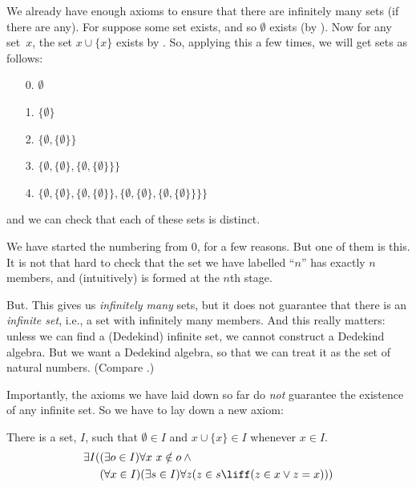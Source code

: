 \documentclass[../../../include/open-logic-section]{subfiles}
\begin{document}

We already have enough axioms to ensure that there are infinitely many
sets (if there are any). For suppose some set exists, and so
$\emptyset$ exists (by ). Now for
any set~$x$, the set $x \cup \{x\}$ exists by
. So, applying this a few
times, we will get sets as follows:
\begin{enumerate}
	\item[0.] $\emptyset$ %
	\item[1.] $ \{\emptyset\}$ %
	\item[2.] $\{\emptyset, \{\emptyset\}\}$ %
	\item[3.] $\{\emptyset, \{\emptyset\}, \{\emptyset, \{\emptyset\}\}\}$ %
	\item[4.] $\{\emptyset, \{\emptyset\}, \{\emptyset, \{\emptyset\}\}, \{\emptyset, \{\emptyset\}, \{\emptyset, \{\emptyset\}\}\}\}$%
\end{enumerate}
and we can check that each of these sets is distinct. 

We have started the numbering from $0$, for a few reasons. But one of
them is this. It is not that hard to check that the set we have
labelled ``$n$'' has exactly $n$ members, and (intuitively) is formed
at the $n$th stage. 

But. This gives us \emph{infinitely many} sets, but it does not
guarantee that there is an \emph{infinite set}, i.e., a set with
infinitely many members. And this really matters: unless we can find a
(Dedekind) infinite set, we cannot construct a Dedekind algebra. But
we want a Dedekind algebra, so that we can treat it as the set of
natural numbers. (Compare
.)

Importantly, the axioms we have laid down so far do \emph{not}
guarantee the existence of any infinite set. So we have to lay down a
new axiom:

\begin{axiom}[Infinity]
There is a set, $I$, such that $\emptyset \in I$ and $x \cup \{x\} \in I$ whenever $x \in I$.
\begin{align*}
	\exists I( & (\exists o \in I)\forall x\ x \notin o \land {}\\
	& (\forall x \in I)(\exists s \in I)\forall z(z \in s \liff (z \in x \lor z = x)))
\end{align*}
\end{axiom}
\end{document}
